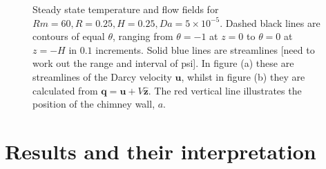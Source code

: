 \documentclass[11pt]{proc}
\begin{document}
\begin{figure}[ht!]
    \caption{Steady state temperature and flow fields for $Rm=60, R=0.25, H=0.25, Da=5\times10^{-5}$. Dashed black lines are contours of equal $\theta$, ranging from $\theta=-1$ at $z=0$ to $\theta=0$ at $z=-H$ in $0.1$ increments. Solid blue lines are streamlines [need to work out the range and interval of psi]. In figure (a) these are streamlines of the Darcy velocity $\mathbf{u}$, whilst in figure (b) they are calculated from $\mathbf{q} = \mathbf{u} + V \mathbf{\hat{z}}$. The red vertical line illustrates the position of the chimney wall, $a$.}
    \label{fig:typical-steady-states}
 \end{figure}

\section{Results and their interpretation}
\label{sec:results}


 
 
\end{document}
